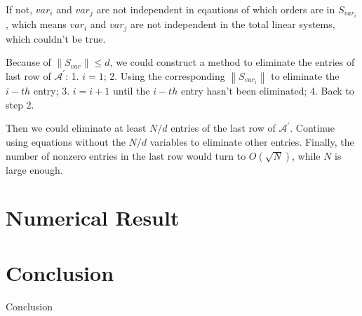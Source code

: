 \documentclass[%
 reprint,
 amsmath,amssymb,
pra,
]{revtex4-1}
\begin{document}
If not, $var_i$ and $var_j$ are not independent in eqautions of which orders are in $S_{var_i}$,  which means $var_i$ and $var_j$ are not independent in the total linear systems, which couldn't be true. 

Because of $\left\|S_{var}\right\|\leq d$, we could construct a method to eliminate the entries of last row of $\mathcal{A^{\prime}}$: 1. $i=1$; 2. Using the corresponding $\left\|S_{var_i}\right\|$ to eliminate the $i-th$ entry; 3. $i=i+1$ until the $i-th$ entry hasn't been eliminated; 4. Back to step 2. 

Then we could eliminate at least $N/d$ entries of the last row of $\mathcal{A^{\prime}}$. Continue using equations without the $N/d$ variables to eliminate other entries. Finally, the number of nonzero entries in the last row would turn to $O(\sqrt{N})$, while $N$ is large enough.
\fi



\section{Numerical Result}
\newpage



\section{Conclusion}
Conclusion





\end{document}
